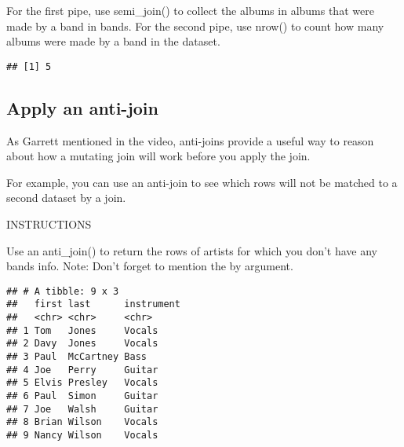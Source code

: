 \documentclass[]{article}
\newenvironment{Shaded}{\begin{snugshade}}{\end{snugshade}}
\newcommand{\KeywordTok}[1]{\textcolor[rgb]{0.13,0.29,0.53}{\textbf{#1}}}
\newcommand{\DataTypeTok}[1]{\textcolor[rgb]{0.13,0.29,0.53}{#1}}
\newcommand{\StringTok}[1]{\textcolor[rgb]{0.31,0.60,0.02}{#1}}
\newcommand{\CommentTok}[1]{\textcolor[rgb]{0.56,0.35,0.01}{\textit{#1}}}
\newcommand{\OperatorTok}[1]{\textcolor[rgb]{0.81,0.36,0.00}{\textbf{#1}}}
\newcommand{\NormalTok}[1]{#1}
\begin{document}
For the first pipe, use semi\_join() to collect the albums in albums
that were made by a band in bands. For the second pipe, use nrow() to
count how many albums were made by a band in the dataset.

\begin{Shaded}
\end{Shaded}

\begin{verbatim}
## [1] 5
\end{verbatim}

\subsection{Apply an anti-join}\label{apply-an-anti-join}

As Garrett mentioned in the video, anti-joins provide a useful way to
reason about how a mutating join will work before you apply the join.

For example, you can use an anti-join to see which rows will not be
matched to a second dataset by a join.

INSTRUCTIONS

Use an anti\_join() to return the rows of artists for which you don't
have any bands info. Note: Don't forget to mention the by argument.

\begin{Shaded}
\end{Shaded}

\begin{verbatim}
## # A tibble: 9 x 3
##   first last      instrument
##   <chr> <chr>     <chr>     
## 1 Tom   Jones     Vocals    
## 2 Davy  Jones     Vocals    
## 3 Paul  McCartney Bass      
## 4 Joe   Perry     Guitar    
## 5 Elvis Presley   Vocals    
## 6 Paul  Simon     Guitar    
## 7 Joe   Walsh     Guitar    
## 8 Brian Wilson    Vocals    
## 9 Nancy Wilson    Vocals
\end{verbatim}
\end{document}
